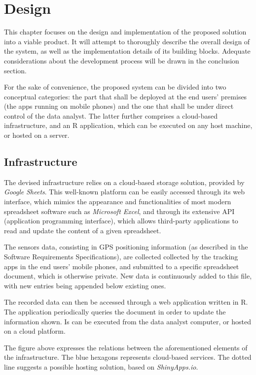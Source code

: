 \chapter{Design}
This chapter focuses on the design and implementation of the proposed solution into a viable product.
It will attempt to thoroughly describe the overall design of the system, as well as the implementation details of its building blocks.
Adequate considerations about the development process will be drawn in the conclusion section.

For the sake of convenience, the proposed system can be divided into two conceptual categories: the part that shall be deployed at the end users' premises (the apps running on mobile phones) and the one that shall be under direct control of the data analyst.
The latter further comprises a cloud-based infrastructure, and an R application, which can be executed on any host machine, or hosted on a server.


\section{Infrastructure}
The devised infrastructure relies on a cloud-based storage solution, provided by \emph{Google Sheets}.
This well-known platform can be easily accessed through its web interface, which mimics the appearance and functionalities of most modern spreadsheet software such as \emph{Microsoft Excel}, and through its extensive API (application programming interface), which allows third-party applications to read and update the content of a given spreadsheet.

The sensors data, consisting in GPS positioning information (as described in the Software Requirements Specifications), are collected collected by the tracking apps in the end users' mobile phones, and submitted to a specific spreadsheet document, which is otherwise private.
New data is continuously added to this file, with new entries being appended below existing ones.

The recorded data can then be accessed through a web application written in R.
The application periodically queries the document in order to update the information shown.
Is can be executed from the data analyst computer, or hosted on a cloud platform.


The figure above expresses the relations between the aforementioned elements of the infrastructure.
The blue hexagons represents cloud-based services.
The dotted line suggests a possible hosting solution, based on \emph{ShinyApps.io}.

